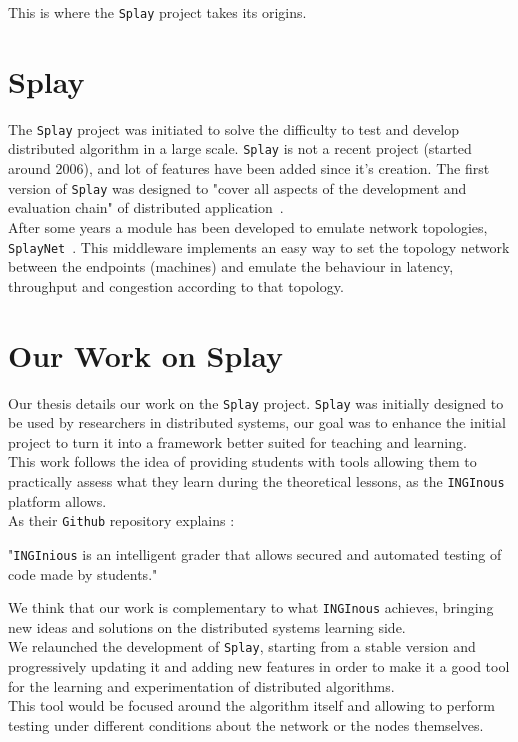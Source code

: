 \documentclass{eplmastersthesis}
\begin{document}
      This is where the \texttt{Splay} project takes its origins.

    \section{Splay}

      The \texttt{Splay} project was initiated to solve the difficulty to test
      and develop distributed algorithm in a large scale. \texttt{Splay} is
      not a recent project (started around 2006), and lot of features have been
      added since it's creation. The first version of \texttt{Splay} was
      designed to "cover all aspects of the development and evaluation
      chain" of distributed application~\cite{SPLAY}.\\
      After some years a module has been developed to emulate network
      topologies, \texttt{SplayNet}~\cite{SplayNet}. This middleware implements
      an easy way to set the topology network between the endpoints (machines)
      and emulate the behaviour in latency, throughput and congestion according
      to that topology.

    \section{Our Work on Splay}

      Our thesis details our work on the \texttt{Splay} project. \texttt{Splay}
      was initially designed to be used by researchers in distributed systems,
      our goal was to enhance the initial project to turn it into a framework
      better suited for teaching and learning.\\
      This work follows the idea of providing students with tools
      allowing them to practically assess what they learn during the
      theoretical lessons, as the \texttt{INGInous}~\cite{inginious} platform allows.\\
      As their \texttt{Github} repository explains :
      \begin{displayquote}
        "\texttt{INGInious} is an intelligent grader that allows secured and
        automated testing of code made by students."
      \end{displayquote}
      We think that our work is complementary to what \texttt{INGInous} achieves,
      bringing new ideas and solutions on the distributed systems learning
      side.\\

      We relaunched the development of \texttt{Splay}, starting from a stable
      version and progressively updating it and adding new
      features in order to make it a good tool for the learning and
      experimentation of distributed algorithms.\\
      This tool would be focused around the algorithm itself and allowing to
      perform testing under different conditions about the network or
      the nodes themselves.\\
\end{document}
